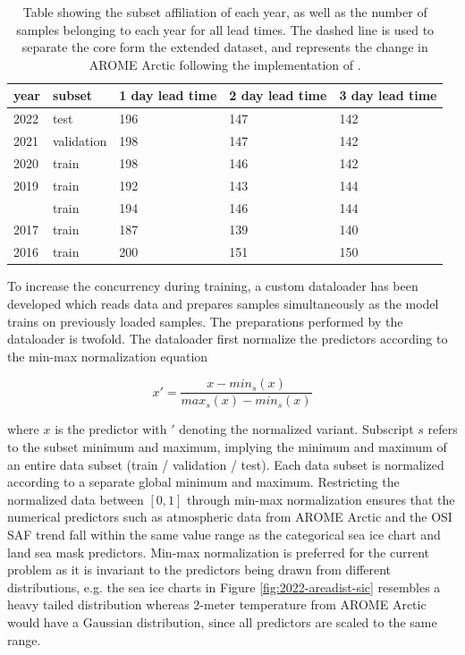 \documentclass[../main/thesis]{subfiles}
\begin{document}
\begin{table}[]
    \caption{\label{tab:data_subset_sizes}Table showing the subset affiliation of each year, as well as the number of samples belonging to each year for all lead times. The dashed line is used to separate the core form the extended dataset, and represents the change in AROME Arctic following the implementation of \protect\citet{Batrak2019}.}
    \centering
    \setlength{\arrayrulewidth}{0.5mm}
    \renewcommand{\arraystretch}{1.3}
    \begin{tabular}{lllll}
    \hline
    year   & subset & 1 day lead time & 2 day lead time & 3 day lead time \\
    \hline
    2022 & test       & 196 & 147 & 142 \\
    2021 & validation & 198 & 147 & 142 \\
    2020 & train      & 198 & 146 & 142 \\
    2019 & train      & 192 & 143 & 144 \\
    \hdashline
    2018 & train      & 194 & 146 & 144 \\
    2017 & train      & 187 & 139 & 140 \\
    2016 & train      & 200 & 151 & 150 \\
    \hline         
    \end{tabular}
\end{table}

To increase the concurrency during training, a custom dataloader has been developed which reads data and prepares samples simultaneously as the model trains on previously loaded samples. The preparations performed by the dataloader is twofold. The dataloader first normalize the predictors according to the min-max normalization equation 

\begin{equation}
    x' = \frac{x - min_s(x)}{max_s(x) - min_s(x)}
\end{equation}

where $x$ is the predictor with $'$ denoting the normalized variant. Subscript $s$ refers to the subset minimum and maximum, implying the minimum and maximum of an entire data subset (train / validation / test). Each data subset is normalized according to a separate global minimum and maximum. Restricting the normalized data between $\left[0, 1\right]$ through min-max normalization ensures that the numerical predictors such as atmospheric data from AROME Arctic and the OSI SAF trend fall within the same value range as the categorical sea ice chart and land sea mask predictors. Min-max normalization is preferred for the current problem as it is invariant to the predictors being drawn from different distributions, e.g. the sea ice charts in Figure \ref{fig:2022-areadist-sic} resembles a heavy tailed distribution whereas 2-meter temperature from AROME Arctic would have a Gaussian distribution, since all predictors are scaled to the same range.
\end{document}

